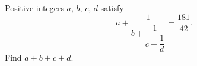 Positive integers $a$, $b$, $c$, $d$ satisfy
\[
a+\dfrac{1}{b+\dfrac{1}{c+\dfrac{1}{d}}}=\dfrac{181}{42}.
\]
Find $a+b+c+d$.
